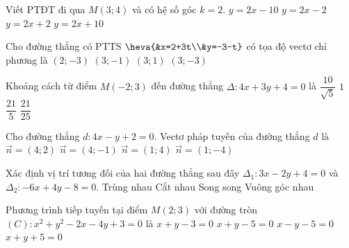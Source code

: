 	\begin{ex}%
		Viết PTĐT đi qua $M\left( 3;4 \right)$ và có hệ số góc $k=2$. 
		\choice
		{$y=2x-10$}
		{\True $y=2x-2$}
		{$y=2x+2$}
		{$y=2x+10$}
	\end{ex}
	
	

\begin{ex}%
	Cho đường thẳng có PTTS $\heva{&x=2+3t\\&y=-3-t}$ có tọa độ vectơ chỉ phương là
	\choice
	{$\left(2;-3\right)$}
	{\True $\left(3;-1\right)$}
	{$\left(3;1\right)$}
	{$\left(3;-3\right)$}
\end{ex}
\begin{ex}%
	Khoảng cách từ điểm $M(-2;3)$ đến đường thẳng $\Delta \colon 4x+3y+4=0$ là
	\choice
	{$\dfrac{10}{\sqrt{5}}$}
	{\True $1$}
	{$\dfrac{21}{5}$}
	{$\dfrac{21}{25}$}
\end{ex}
\begin{ex}%
	Cho đường thẳng $d \colon 4x-y+2=0$. Vectơ pháp tuyến của đường thẳng $d$ là
	\choice
	{$\overrightarrow{n}=(4;2)$}
	{\True $\overrightarrow{n}=(4;-1)$}
	{$\overrightarrow{n}=(1;4)$}
	{$\overrightarrow{n}=(1;-4)$}
\end{ex}
\begin{ex}%
	Xác định vị trí tương đối của hai đường thẳng sau đây $\Delta_1 \colon 3x-2y+4=0$ và  $\Delta_2 \colon -6x+4y-8=0$.
	\choice
	{\True Trùng nhau}
	{Cắt nhau}
	{Song song}
	{Vuông góc nhau}
\end{ex}
\begin{ex}%
	Phương trình tiếp tuyến tại điểm $M(2;3)$ với đường tròn $(C) \colon x^2+y^2-2x-4y+3=0$ là
	\choice
	{$x+y-3=0$}
	{\True $x+y-5=0$}
	{$x-y-5=0$}
	{$x+y+5=0$}
\end{ex}

